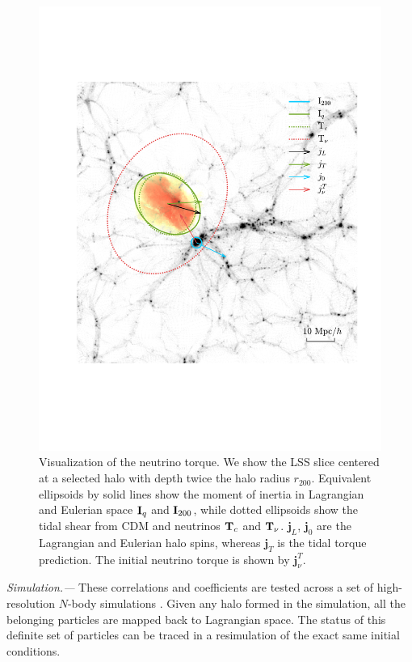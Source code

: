 \documentclass[aps,prd,twocolumn,amsmath,amssymb,amsfont,superscriptaddress,nofootinbib]{revtex4-1}
\newcommand{\bs}{\boldsymbol}
\newcommand{\T}{\bold{T}}
\newcommand{\I}{\bold{I}}
\newcommand{\spin}{\bs{j}}
\begin{document}
\begin{figure}
\centering
  \includegraphics[width=1\linewidth]{f1}
 \caption{Visualization of the neutrino torque. 
 We show the LSS slice centered at a selected halo with depth twice the halo radius $r_{200}$. 
 Equivalent ellipsoids by solid lines show the moment of inertia in Lagrangian and Eulerian space $\I_q$ and $\I_{200}$, 
 while dotted ellipsoids show the tidal shear from CDM and neutrinos $\T_c$ and $\T_\nu$. $\spin_L$, 
 $\spin_0$ are the Lagrangian and Eulerian halo spins, whereas $\spin_T$ is the tidal torque prediction. 
 The initial neutrino torque is shown by $\spin^T_\nu$.}\label{fig.1}
\end{figure}

\textit{Simulation.---}
These correlations and coefficients are tested across a set of high-resolution $N$-body simulations \citep{2018ApJS..237...24Y}. 
Given any halo formed in the simulation, all the belonging particles are mapped back to Lagrangian space. 
The status of this definite set of particles can be traced in a resimulation of the exact same initial conditions.
\end{document}

